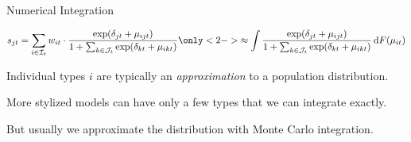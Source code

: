 \documentclass[aspectratio=169,t,11pt,table]{beamer}
\begin{document}
\begin{frame}{Numerical Integration}
    \vspace{-\baselineskip}
    \begin{minipage}[c][4\baselineskip][c]{\textwidth}
        \begin{equation*}
            s_{jt} = \sum_{i \in \mathcal{I}_t} w_{it} \cdot \frac{\exp(\delta_{jt} + \mu_{ijt})}{1 + \sum_{k \in \mathcal{J}_t} \exp(\delta_{kt} + \mu_{ikt})} \only<2->{\approx \int \frac{\exp(\delta_{jt} + \mu_{ijt})}{1 + \sum_{k \in \mathcal{J}_t} \exp(\delta_{kt} + \mu_{ikt})} \,\mathrm{d}F(\mu_{it})}
        \end{equation*}
    \end{minipage}
    \vspace{-0.5\baselineskip}
    \pause
    \begin{wideitemize}
        \item Individual types $i$ are typically an \textit{approximation} to a population distribution.
        \pause
        \item More stylized models can have only a few types that we can integrate exactly.
        \pause
        \item But usually we approximate the distribution with \alert{Monte Carlo} integration.
\end{wideitemize}
\end{frame}
\end{document}
